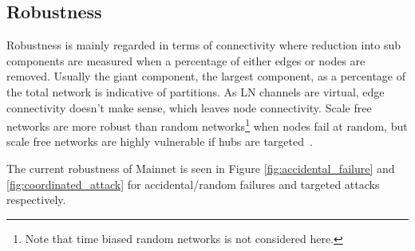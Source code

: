\subsection{Robustness}

Robustness is mainly regarded in terms of connectivity where reduction into sub components are measured when a percentage of either edges or nodes are removed. Usually the giant component, the largest component, as a percentage of the total network is indicative of partitions. As LN channels are virtual, edge connectivity doesn't make sense, which leaves node connectivity. Scale free networks are more robust than random networks\footnote{Note that time biased random networks is not considered here.} when nodes fail at random, but scale free networks are highly vulnerable if hubs are targeted~\cite{barabasi:robustness}. 

The current robustness of Mainnet is seen in Figure \ref{fig:accidental_failure} and \ref{fig:coordinated_attack} for accidental/random failures and targeted attacks respectively.

